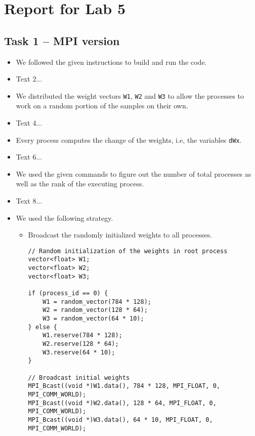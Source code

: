 \documentclass[a4paper, DIV12, headsepline]{scrartcl}
\begin{document}
\section*{Report for Lab 5}
\subsection*{Task 1 -- MPI version}
\begin{itemize}
\item We followed the given instructions to build and run the code.

\item Text 2...

\item We distributed the weight vectors \texttt{W1}, \texttt{W2} and \texttt{W3} to allow the processes to work on a random portion of the samples on their own.

\item Text 4...

\item Every process computes the change of the weights, i.e, the variables \texttt{dWx}.

\item Text 6...

\item We used the given commands to figure out the number of total processes as well as the rank of the executing process.

\item Text 8...

\item We used the following strategy.
\begin{itemize}
\item Broadcast the randomly initialized weights to all processes.
\begin{verbatim}
// Random initialization of the weights in root process
vector<float> W1;
vector<float> W2;
vector<float> W3;

if (process_id == 0) {
    W1 = random_vector(784 * 128);
    W2 = random_vector(128 * 64);
    W3 = random_vector(64 * 10);
} else {
    W1.reserve(784 * 128);
    W2.reserve(128 * 64);
    W3.reserve(64 * 10);
}

// Broadcast initial weights
MPI_Bcast((void *)W1.data(), 784 * 128, MPI_FLOAT, 0, MPI_COMM_WORLD);
MPI_Bcast((void *)W2.data(), 128 * 64, MPI_FLOAT, 0, MPI_COMM_WORLD);
MPI_Bcast((void *)W3.data(), 64 * 10, MPI_FLOAT, 0, MPI_COMM_WORLD);
\end{verbatim}


\end{itemize}
\end{itemize}
\end{document}
